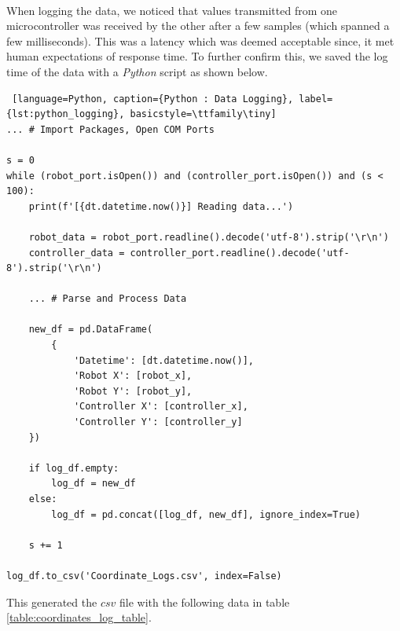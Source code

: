 \documentclass{article}
\begin{document}
\

When logging the data, we noticed that values transmitted from one microcontroller was received by the other after a few samples (which spanned a few milliseconds). This was a latency which
was deemed acceptable since, it met human expectations of response time. To further confirm this, we saved the log time of the data with a \textit{Python} script as shown below.

\begin{lstlisting} [language=Python, caption={Python : Data Logging}, label={lst:python_logging}, basicstyle=\ttfamily\tiny]
... # Import Packages, Open COM Ports

s = 0
while (robot_port.isOpen()) and (controller_port.isOpen()) and (s < 100):
    print(f'[{dt.datetime.now()}] Reading data...')

    robot_data = robot_port.readline().decode('utf-8').strip('\r\n')
    controller_data = controller_port.readline().decode('utf-8').strip('\r\n')

    ... # Parse and Process Data

    new_df = pd.DataFrame(
        {
            'Datetime': [dt.datetime.now()],
            'Robot X': [robot_x],
            'Robot Y': [robot_y],
            'Controller X': [controller_x],
            'Controller Y': [controller_y]
    })

    if log_df.empty:
        log_df = new_df
    else:
        log_df = pd.concat([log_df, new_df], ignore_index=True)

    s += 1

log_df.to_csv('Coordinate_Logs.csv', index=False)
\end{lstlisting}

This generated the $csv$ file with the following data in table \ref{table:coordinates_log_table}.
\end{document}
